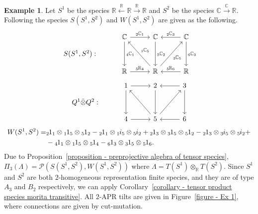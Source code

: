\documentclass[a4paper, reqno]{amsart}
\theoremstyle{definition}
\newtheorem{myex}[mythm]{Example}
\newcommand\lsub[1]{{}_{#1}\hspace{-0.25mm}}
\newcommand{\C}{\mathbb{C}}
\newcommand{\R}{\mathbb{R}}
\begin{document}
\begin{myex}\label{ex - example for intro}
	Let $S^1$ be the species $\R \xleftarrow{\R}\R \xrightarrow{\R}\R$ and $S^2$ be the species $\C\xrightarrow{\C}\R$. Following \cite[Example 6.11]{soderberg2024mutation} the species $S(S^1, S^2)$ and $W(S^1, S^2)$ are given as the following.
	\begin{equation*}
		\begin{tikzcd}[row sep = 0.3cm, column sep = 1cm]
			& \C \arrow[r, "\lsub{2}\C_1"] \arrow[dd, "\lsub{4}\C_1"] & \C \arrow[dd, "\lsub{5}\C_2"] & \C \arrow[l, "\lsub{2}\C_3"'] \arrow[dd, "\lsub{6}\C_3"] \\
			S(S^1, S^2): \\
			& \R \arrow[r, "\lsub{5}\R_4"] & \R \arrow[luu, "\lsub{1}\C_5"'] \arrow[ruu, "\lsub{3}\C_5"'] & \R \arrow[l, "\lsub{5}\R_6"']
		\end{tikzcd}
	\end{equation*}
	\begin{equation*}
		\begin{tikzcd}[row sep = 0.3cm, column sep = 1cm]
			& 1 \arrow[r] \arrow[dd] & 2 \arrow[dd] & 3 \arrow[l] \arrow[dd] \\ 
			Q^1\tilde\otimes Q^2: \\
			& 4 \arrow[r] & 5 \arrow[luu] \arrow[ruu] & 6 \arrow[l]
		\end{tikzcd}
	\end{equation*}
	\begin{equation}\label{eq - potential in example at end 1}
		\begin{aligned}
			W(S^1, S^2) =& \lsub{2}1_1\otimes \lsub{1}1_5\otimes \lsub{5}1_2 - \lsub{2}1_1\otimes \lsub{1}i_5\otimes \lsub{5}i_2 + \lsub{2}1_3\otimes \lsub{3}1_5\otimes \lsub{5}1_2 - \lsub{2}1_3\otimes \lsub{3}i_5\otimes \lsub{5}i_2 + \\
			&- \lsub{4}1_1\otimes \lsub{1}1_5\otimes \lsub{5}1_4 - \lsub{6}1_3\otimes \lsub{3}1_5\otimes \lsub{5}1_6.
		\end{aligned}
	\end{equation}
	Due to Proposition~\ref{proposition - preprojective algebra of tensor species}, $\Pi_3(\Lambda) = \mathcal{P}(S(S^1, S^2), W(S^1, S^2))$ where $\Lambda = T(S^1)\otimes_\R T(S^2)$. Since $S^1$ and $S^2$ are both $2$-homogeneous representation finite species, and they are of type $A_3$ and $B_2$ respectively, we can apply Corollary~\ref{corollary - tensor product species morita transitive}. All $2$-APR tilts are given in Figure~\ref{figure - Ex 1}, where connections are given by cut-mutation.

\end{myex}
\end{document}
